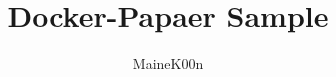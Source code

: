 \documentclass[a4paper]{jsarticle}
\begin{document}
\title{Docker-Papaer Sample}
\author{MaineK00n}
\maketitle


\end{document}
